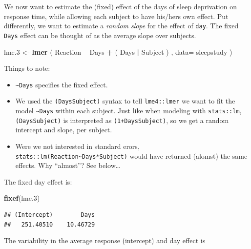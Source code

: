 \documentclass[]{book}
\newenvironment{Shaded}{\begin{snugshade}}{\end{snugshade}}
\newcommand{\DataTypeTok}[1]{\textcolor[rgb]{0.13,0.29,0.53}{#1}}
\newcommand{\FloatTok}[1]{\textcolor[rgb]{0.00,0.00,0.81}{#1}}
\newcommand{\KeywordTok}[1]{\textcolor[rgb]{0.13,0.29,0.53}{\textbf{#1}}}
\newcommand{\NormalTok}[1]{#1}
\newcommand{\OperatorTok}[1]{\textcolor[rgb]{0.81,0.36,0.00}{\textbf{#1}}}
\newcommand{\StringTok}[1]{\textcolor[rgb]{0.31,0.60,0.02}{#1}}
\providecommand{\tightlist}{%
  \setlength{\itemsep}{0pt}\setlength{\parskip}{0pt}}
\theoremstyle{definition}
\theoremstyle{definition}
\theoremstyle{definition}
\theoremstyle{remark}
\begin{document}
We now want to estimate the (fixed) effect of the days of sleep deprivation on response time, while allowing each subject to have his/hers own effect.
Put differently, we want to estimate a \emph{random slope} for the effect of \texttt{day}.
The fixed \texttt{Days} effect can be thought of as the average slope over subjects.

\begin{Shaded}
\begin{Highlighting}[]
\NormalTok{lme}\FloatTok{.3}\NormalTok{ <-}\StringTok{ }\KeywordTok{lmer}\NormalTok{ ( Reaction }\OperatorTok{~}\StringTok{ }\NormalTok{Days }\OperatorTok{+}\StringTok{ }\NormalTok{( Days }\OperatorTok{|}\StringTok{ }\NormalTok{Subject ) , }\DataTypeTok{data=}\NormalTok{ sleepstudy )}
\end{Highlighting}
\end{Shaded}

Things to note:

\begin{itemize}
\tightlist
\item
  \texttt{\textasciitilde{}Days} specifies the fixed effect.
\item
  We used the \texttt{(Days\textbar{}Subject)} syntax to tell \texttt{lme4::lmer} we want to fit the model \texttt{\textasciitilde{}Days} within each subject. Just like when modeling with \texttt{stats::lm}, \texttt{(Days\textbar{}Subject)} is interpreted as \texttt{(1+Days\textbar{}Subject)}, so we get a random intercept and slope, per subject.
\item
  Were we not interested in standard erors, \texttt{stats::lm(Reaction\textasciitilde{}Days*Subject)} would have returned (alomst) the same effects. Why ``almost''? See below\ldots{}
\end{itemize}

The fixed day effect is:

\begin{Shaded}
\begin{Highlighting}[]
\KeywordTok{fixef}\NormalTok{(lme}\FloatTok{.3}\NormalTok{)}
\end{Highlighting}
\end{Shaded}

\begin{verbatim}
## (Intercept)        Days 
##   251.40510    10.46729
\end{verbatim}

The variability in the average response (intercept) and day effect is

\begin{Shaded}
\end{Shaded}
\end{document}
